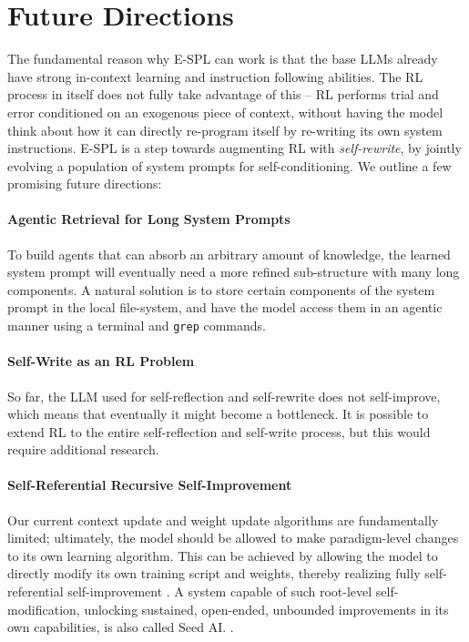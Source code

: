 \documentclass{article}
\theoremstyle{plain}
\theoremstyle{definition}
\theoremstyle{remark}
\begin{document}
\section{Future Directions}

The fundamental reason why E-SPL can work is that the base LLMs already have strong in-context learning and instruction following abilities. The RL process in itself does not fully take advantage of this -- RL performs trial and error conditioned on an exogenous piece of context, without having the model think about how it can directly re-program itself by re-writing its own system instructions. E-SPL is a step towards augmenting RL with \textit{self-rewrite}, by jointly evolving a population of system prompts for self-conditioning. We outline a few promising future directions:

\vspace{-6pt}
\paragraph{Agentic Retrieval for Long System Prompts} To build agents that can absorb an arbitrary amount of knowledge, the learned system prompt will eventually need a more refined sub-structure with many long components. A natural solution is to store certain components of the system prompt in the local file-system, and have the model access them in an agentic manner using a terminal and \texttt{grep} commands.

\vspace{-6pt}
\paragraph{Self-Write as an RL Problem} So far, the LLM used for self-reflection and self-rewrite does not self-improve, which means that eventually it might become a bottleneck. It is possible to extend RL to the entire self-reflection and self-write process, but this would require additional research.

\vspace{-6pt}
\paragraph{Self-Referential Recursive Self-Improvement} Our current context update and weight update algorithms are fundamentally limited; ultimately, the model should be allowed to make paradigm-level changes to its own learning algorithm. This can be achieved by allowing the model to directly modify its own training script and weights, thereby realizing fully self-referential self-improvement \cite{godel-machines, schmidhuber2005completely}. A system capable of such root-level self-modification, unlocking sustained, open-ended, unbounded improvements in its own capabilities, is also called Seed AI. \cite{seed-ai}.
\end{document}
